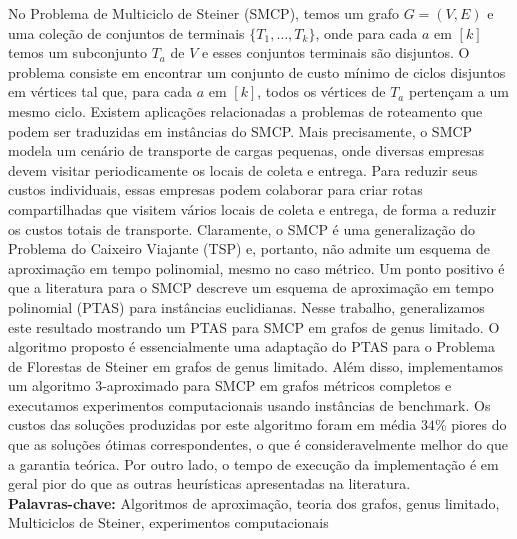 No Problema de Multiciclo de Steiner (SMCP), temos um grafo \(G = (V, E)\) e uma coleção de conjuntos de terminais \(\{T_1, \dots , T_k\}\), onde para cada \(a\) em \([k]\) temos um subconjunto \(T_a\) de \(V\) e esses conjuntos terminais são disjuntos. O problema consiste em encontrar um conjunto de custo mínimo de ciclos disjuntos em vértices tal que, para cada \(a\) em \([k]\), todos os vértices de \(T_a\) pertençam a um mesmo ciclo.
Existem aplicações relacionadas a problemas de roteamento que podem ser traduzidas em instâncias do SMCP.
Mais precisamente, o SMCP modela um cenário de transporte de cargas pequenas, onde diversas empresas devem visitar periodicamente os locais de coleta e entrega.
Para reduzir seus custos individuais, essas empresas podem colaborar para criar rotas compartilhadas que visitem vários locais de coleta e entrega, de forma a reduzir os custos totais de transporte.
Claramente, o SMCP é uma generalização do Problema do Caixeiro Viajante (TSP) e, portanto, não admite um esquema de aproximação em tempo polinomial, mesmo no caso métrico.
Um ponto positivo é que a literatura para o SMCP descreve um esquema de aproximação em tempo polinomial (PTAS) para instâncias euclidianas. Nesse trabalho, generalizamos este resultado mostrando um PTAS para SMCP em grafos de genus limitado.
O algoritmo proposto é essencialmente uma adaptação do PTAS para o Problema de Florestas de Steiner em grafos de genus limitado.
Além disso, implementamos um algoritmo 3-aproximado para SMCP em grafos métricos completos e executamos experimentos computacionais usando instâncias de benchmark.
Os custos das soluções produzidas por este algoritmo foram em média \(34\%\) piores do que as soluções ótimas correspondentes, o que é consideravelmente melhor do que a garantia teórica.
Por outro lado, o tempo de execução da implementação é em geral pior do que as outras heurísticas apresentadas na literatura.
\hfill\\

\noindent\textbf{Palavras-chave:} Algoritmos de aproximação, teoria dos grafos, genus limitado, Multiciclos de Steiner, experimentos computacionais